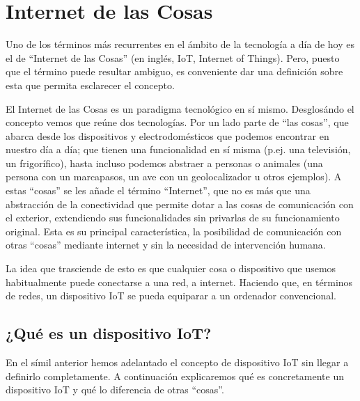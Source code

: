\documentclass[a4paper,10pt]{article}
\begin{document}
\tableofcontents



\newpage

\section{Internet de las Cosas}\label{internet-de-las-cosas}

Uno de los términos más recurrentes en el ámbito de la tecnología a día
de hoy es el de ``Internet de las Cosas'' (en inglés, IoT, Internet of
Things). Pero, puesto que el término puede resultar ambiguo, es
conveniente dar una definición sobre esta que permita esclarecer el
concepto.

El Internet de las Cosas es un paradigma tecnológico en sí mismo.
Desglosándo el concepto vemos que reúne dos tecnologías. Por un lado
parte de ``las cosas'', que abarca desde los dispositivos y
electrodomésticos que podemos encontrar en nuestro día a día; que tienen
una funcionalidad en sí misma (p.ej. una televisión, un frigorífico),
hasta incluso podemos abstraer a personas o animales (una persona con un
marcapasos, un ave con un geolocalizador u otros ejemplos\cite{iotagendawebsiteWhatInternetThings}). A estas ``cosas'' se les añade el término
``Internet'', que no es más que una abstracción de la conectividad que
permite dotar a las cosas de comunicación con el exterior, extendiendo
sus funcionalidades sin privarlas de su funcionamiento original. Esta es
su principal característica, la posibilidad de comunicación con otras
``cosas'' mediante internet y sin la necesidad de intervención humana.

La idea que trasciende de esto es que cualquier cosa o dispositivo que
usemos habitualmente puede conectarse a una red, a internet. Haciendo
que, en términos de redes, un dispositivo IoT se pueda equiparar a un
ordenador convencional.

\subsection{¿Qué es un dispositivo
IoT?}\label{quuxe9-es-un-dispositivo-iot}

En el símil anterior hemos adelantado el concepto de dispositivo IoT sin
llegar a definirlo completamente. A continuación explicaremos qué es
concretamente un dispositivo IoT y qué lo diferencia de otras ``cosas''.
\end{document}

